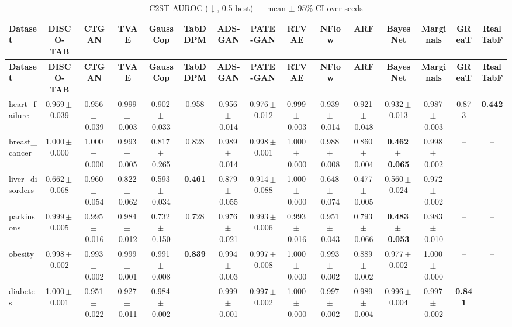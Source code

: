 \documentclass[8pt]{extarticle}
\begin{document}
\begin{longtable}{l*{14}{c}}
\caption{C2ST AUROC ($\downarrow$, 0.5 best) --- mean $\pm$ 95\% CI over seeds}\\
\toprule
\textbf{Dataset} & \textbf{DISCO-TAB} & \textbf{CTGAN} & \textbf{TVAE} & \textbf{GaussCop} & \textbf{TabDDPM} & \textbf{ADS-GAN} & \textbf{PATE-GAN} & \textbf{RTVAE} & \textbf{NFlow} & \textbf{ARF} & \textbf{BayesNet} & \textbf{Marginals} & \textbf{GReaT} & \textbf{RealTabF} \\
\midrule
\endfirsthead
\toprule
\textbf{Dataset} & \textbf{DISCO-TAB} & \textbf{CTGAN} & \textbf{TVAE} & \textbf{GaussCop} & \textbf{TabDDPM} & \textbf{ADS-GAN} & \textbf{PATE-GAN} & \textbf{RTVAE} & \textbf{NFlow} & \textbf{ARF} & \textbf{BayesNet} & \textbf{Marginals} & \textbf{GReaT} & \textbf{RealTabF} \\
\midrule
\endhead
\bottomrule
\endfoot
heart\_failure & 0.969\,$\pm$\,0.039 & 0.956\,$\pm$\,0.039 & 0.999\,$\pm$\,0.003 & 0.902\,$\pm$\,0.033 & 0.958 & 0.956\,$\pm$\,0.014 & 0.976\,$\pm$\,0.012 & 0.999\,$\pm$\,0.003 & 0.939\,$\pm$\,0.014 & 0.921\,$\pm$\,0.048 & 0.932\,$\pm$\,0.013 & 0.987\,$\pm$\,0.003 & 0.873 & \textbf{0.442} \\
breast\_cancer & 1.000\,$\pm$\,0.000 & 1.000\,$\pm$\,0.000 & 0.993\,$\pm$\,0.005 & 0.817\,$\pm$\,0.265 & 0.828 & 0.989\,$\pm$\,0.014 & 0.998\,$\pm$\,0.001 & 1.000\,$\pm$\,0.000 & 0.988\,$\pm$\,0.008 & 0.860\,$\pm$\,0.004 & \textbf{0.462\,$\pm$\,0.065} & 0.998\,$\pm$\,0.002 & -- & -- \\
liver\_disorders & 0.662\,$\pm$\,0.068 & 0.960\,$\pm$\,0.054 & 0.822\,$\pm$\,0.062 & 0.593\,$\pm$\,0.034 & \textbf{0.461} & 0.879\,$\pm$\,0.055 & 0.914\,$\pm$\,0.088 & 1.000\,$\pm$\,0.000 & 0.648\,$\pm$\,0.074 & 0.477\,$\pm$\,0.005 & 0.560\,$\pm$\,0.024 & 0.972\,$\pm$\,0.002 & -- & -- \\
parkinsons & 0.999\,$\pm$\,0.005 & 0.995\,$\pm$\,0.016 & 0.984\,$\pm$\,0.012 & 0.732\,$\pm$\,0.150 & 0.728 & 0.976\,$\pm$\,0.021 & 0.993\,$\pm$\,0.006 & 0.993\,$\pm$\,0.016 & 0.951\,$\pm$\,0.043 & 0.793\,$\pm$\,0.066 & \textbf{0.483\,$\pm$\,0.053} & 0.983\,$\pm$\,0.010 & -- & -- \\
obesity & 0.998\,$\pm$\,0.002 & 0.993\,$\pm$\,0.002 & 0.999\,$\pm$\,0.001 & 0.991\,$\pm$\,0.008 & \textbf{0.839} & 0.994\,$\pm$\,0.003 & 0.997\,$\pm$\,0.008 & 1.000\,$\pm$\,0.000 & 0.993\,$\pm$\,0.002 & 0.889\,$\pm$\,0.002 & 0.977\,$\pm$\,0.002 & 1.000\,$\pm$\,0.000 & -- & -- \\
diabetes & 1.000\,$\pm$\,0.001 & 0.951\,$\pm$\,0.022 & 0.927\,$\pm$\,0.011 & 0.984\,$\pm$\,0.002 & -- & 0.999\,$\pm$\,0.001 & 0.997\,$\pm$\,0.002 & 1.000\,$\pm$\,0.000 & 0.997\,$\pm$\,0.002 & 0.989\,$\pm$\,0.004 & 0.996\,$\pm$\,0.004 & 0.997\,$\pm$\,0.002 & \textbf{0.841} & -- \\

\end{longtable}
\end{document}
